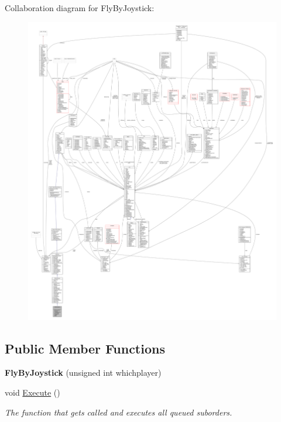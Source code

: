 Collaboration diagram for Fly\+By\+Joystick\+:
\nopagebreak
\begin{figure}[H]
\begin{center}
\leavevmode
\includegraphics[width=350pt]{de/d73/classFlyByJoystick__coll__graph}
\end{center}
\end{figure}
\subsection*{Public Member Functions}
\begin{DoxyCompactItemize}
\item 
{\bfseries Fly\+By\+Joystick} (unsigned int whichplayer)\hypertarget{classFlyByJoystick_a642906074868f4572aabda2fdddf5fdf}{}\label{classFlyByJoystick_a642906074868f4572aabda2fdddf5fdf}

\item 
void \hyperlink{classFlyByJoystick_a16e27ea4dc855164a923a19b56d00c6f}{Execute} ()\hypertarget{classFlyByJoystick_a16e27ea4dc855164a923a19b56d00c6f}{}\label{classFlyByJoystick_a16e27ea4dc855164a923a19b56d00c6f}

\begin{DoxyCompactList}\small\item\em The function that gets called and executes all queued suborders. \end{DoxyCompactList}\end{DoxyCompactItemize}
